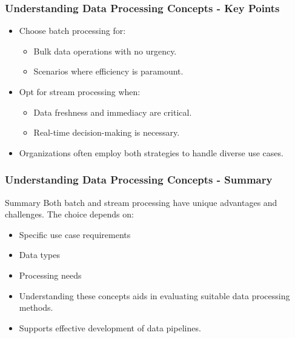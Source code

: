 \documentclass{beamer}
\begin{document}
\begin{frame}[fragile]
    \frametitle{Understanding Data Processing Concepts - Key Points}
    \begin{itemize}
        \item Choose batch processing for:
        \begin{itemize}
            \item Bulk data operations with no urgency.
            \item Scenarios where efficiency is paramount.
        \end{itemize}
        
        \item Opt for stream processing when:
        \begin{itemize}
            \item Data freshness and immediacy are critical.
            \item Real-time decision-making is necessary.
        \end{itemize}
        
        \item Organizations often employ both strategies to handle diverse use cases.
    \end{itemize}
\end{frame}

\begin{frame}[fragile]
    \frametitle{Understanding Data Processing Concepts - Summary}
    \begin{block}{Summary}
        Both batch and stream processing have unique advantages and challenges. The choice depends on:
        \begin{itemize}
            \item Specific use case requirements
            \item Data types
            \item Processing needs
        \end{itemize}
    \end{block}
    
    \begin{itemize}
        \item Understanding these concepts aids in evaluating suitable data processing methods.
        \item Supports effective development of data pipelines.
    \end{itemize}
\end{frame}
\end{document}
